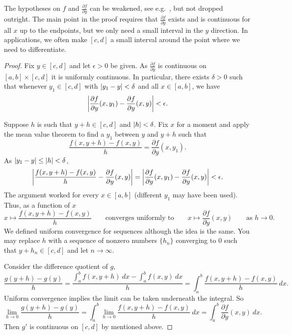 The hypotheses on $f$ and $\frac{\partial f}{\partial y}$ can be
weakened, see e.g.\ ,
but not dropped outright.
The main point in the proof requires that
$\frac{\partial f}{\partial y}$ exists and is continuous for all $x$
up to the endpoints, but we only need a small
interval in the $y$ direction.  In applications, we often make $[c,d]$ a
small interval around the point where we need to differentiate.

\begin{proof}
Fix $y \in [c,d]$ and let $\epsilon > 0$ be given.
As $\frac{\partial f}{\partial y}$ is continuous on $[a,b] \times [c,d]$ it
is uniformly continuous.  In particular, there exists $\delta > 0$ such that
whenever $y_1 \in [c,d]$ with
$\left\lvert {y_1-y} \right\rvert < \delta$ and all $x \in [a,b]$, we have
\begin{equation*}
\left\lvert {\frac{\partial f}{\partial y}(x,y_1)-\frac{\partial f}{\partial y}(x,y)} \right\rvert < \epsilon .
\end{equation*}

Suppose $h$ is such that $y+h \in [c,d]$ and $\left\lvert {h} \right\rvert < \delta$.
Fix $x$ for a moment
and apply the mean value theorem to find a $y_1$ between $y$ and $y+h$ such that
\begin{equation*}
\frac{f(x,y+h)-f(x,y)}{h}
=
\frac{\partial f}{\partial y}(x,y_1) .
\end{equation*}
As $\left\lvert {y_1-y} \right\rvert \leq \left\lvert {h} \right\rvert < \delta$,
\begin{equation*}
\left\lvert {
\frac{f(x,y+h)-f(x,y)}{h}
-
\frac{\partial f}{\partial y}(x,y) 
} \right\rvert
=
\left\lvert {
\frac{\partial f}{\partial y}(x,y_1) 
-
\frac{\partial f}{\partial y}(x,y) 
} \right\rvert
< \epsilon .
\end{equation*}
The argument worked for every $x \in [a,b]$ (different $y_1$ may have been
used).  Thus, as a function of
$x$
\begin{equation*}
x \mapsto \frac{f(x,y+h)-f(x,y)}{h}
\qquad
\text{converges uniformly to}
\qquad
x \mapsto \frac{\partial f}{\partial y}(x,y)
\qquad
\text{as } h \to 0 .
\end{equation*}
We defined uniform convergence for sequences although the idea is the
same.  You may replace $h$ with a sequence of nonzero 
numbers $\{ h_n \}$
converging to $0$ such that $y+h_n \in [c,d]$ and let $n \to \infty$.

Consider the difference quotient of $g$,
\begin{equation*}
\frac{g(y+h)-g(y)}{h}
=
\frac{\int_a^b f(x,y+h) ~dx -
\int_a^b f(x,y) ~dx }{h}
=
\int_a^b \frac{f(x,y+h)-f(x,y)}{h} ~dx .
\end{equation*}
Uniform convergence implies the limit can be taken underneath the integral.
So
\begin{equation*}
\lim_{h\to 0}
\frac{g(y+h)-g(y)}{h}
= 
\int_a^b 
\lim_{h\to 0}
\frac{f(x,y+h)-f(x,y)}{h} ~dx 
=
\int_a^b 
\frac{\partial f}{\partial y}(x,y) ~dx .
\end{equation*}
Then $g'$ is continuous on $[c,d]$ by
 mentioned above.
\end{proof}

